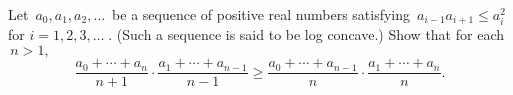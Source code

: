 Let $ \, a_{0}, a_{1}, a_{2},\ldots\,$ be a sequence of positive real numbers satisfying $ \, a_{i-1}a_{i+1}\leq a_{i}^{2}\,$ for $ i = 1,2,3,\ldots\; .$  (Such a sequence is said to be log concave.)  Show that for each $ \, n > 1,$\[ \frac{a_{0}+\cdots+a_{n}}{n+1}\cdot\frac{a_{1}+\cdots+a_{n-1}}{n-1}\geq\frac{a_{0}+\cdots+a_{n-1}}{n}\cdot\frac{a_{1}+\cdots+a_{n}}{n}.\]